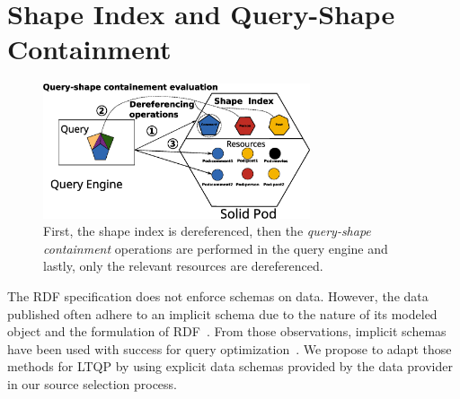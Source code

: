 \section{Shape Index and Query-Shape Containment}

\begin{figure}[h!]
    \centering
    \includegraphics[width=0.7\textwidth]{figure/shape_containement}
    \caption{First, the shape index is dereferenced, 
    then the \emph{query-shape containment} operations are performed in the query engine and lastly, only the relevant resources are dereferenced.}
    \label{fig:shape_index}
\end{figure}




The RDF specification does not enforce schemas on data.
However, the data published often adhere to an implicit schema due to the nature of its modeled object and the formulation of RDF~\cite{Neumann2011CharacteristicSA}.
From those observations, implicit schemas have been used with success for query optimization~\cite{Neumann2011CharacteristicSA, Meimaris2018HierarchicalCS}.
We propose to adapt those methods for LTQP by using explicit data schemas provided by the data provider in our source selection process.

